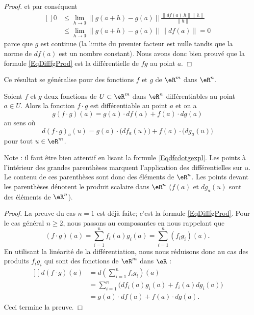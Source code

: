 \begin{proof}
    et par conséquent
    \begin{equation}
        \begin{aligned}[]
            0&\leq\lim_{h\to 0} \| g(a+h)-g(a) \|\frac{ \| df(a).h \|\| h \| }{ \| h \| }\\
            &\leq \lim_{h\to 0} \| g(a+h)-g(a) \|\| df(a) \|=0
        \end{aligned}
    \end{equation}
    parce que $g$ est continue (la limite du premier facteur est nulle tandis que la norme de $df(a)$ est un nombre constant). Nous avons donc bien prouvé que la formule \eqref{EqDifffgProd} est la différentielle de $fg$ au point $a$.
\end{proof}
Ce résultat se généralise pour des fonctions $f$ et $g$ de $\eR^m$ dans $\eR^n$.

\begin{proposition}
	Soient $f$ et $g$ deux fonctions de $U\subset\eR^m$ dans $\eR^n$ différentiables au point $a\in U$. Alors la fonction $f\cdot g$ est différentiable  au point $a$ et on a 
	\begin{equation}
		g(f\cdot g)(a)=g(a)\cdot df(a)+f(a)\cdot dg(a)
	\end{equation}
	au sens où
	\begin{equation}		\label{Eqdfcdotgexpl}
		d(f\cdot g)_a(u)=g(a)\cdot\big( df_a(u) \big)+f(a)\cdot\big( dg_a(u) \big)
	\end{equation}
	pour tout $u\in\eR^m$.
\end{proposition}
Note : il faut être bien attentif en lisant la formule \eqref{Eqdfcdotgexpl}. Les points à l'intérieur des grandes parenthèses marquent l'application des différentielles sur $u$. Le contenu de ces parenthèses sont donc des éléments de $\eR^n$. Les points devant les parenthèses dénotent le produit scalaire dans $\eR^n$ ($f(a)$ et $dg_a(u)$ sont des éléments de $\eR^n$).

\begin{proof}
	La preuve du cas $n=1$ est déjà faite; c'est la formule \eqref{EqDifffgProd}. Pour le cas général $n\geq 2$, nous passons au composantes en nous rappelant que
	\begin{equation}
		(f\cdot g)(a)=\sum_{i=1}^nf_i(a)g_i(a)=\sum_{i=1}^n(f_ig_i)(a).
	\end{equation}
	En utilisant la linéarité de la différentiation, nous nous réduisons donc au cas des produits $f_ig_i$ qui sont des fonctions de $\eR^m$ dans $\eR$ :
	\begin{equation}
		\begin{aligned}[]
			d(f\cdot g)(a)&=d\left( \sum_{i=1}^n f_ig_i \right)(a)\\
			&=\sum_{i=1}^n\big( df_i(a)g_i(a)+f_i(a)dg_i(a) \big)\\
			&=g(a)\cdot df(a)+f(a)\cdot dg(a).
		\end{aligned}
	\end{equation}
	Ceci termine la preuve.
\end{proof}

